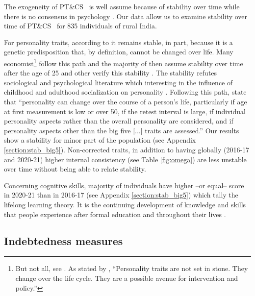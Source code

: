 \documentclass[a4paper, 11pt, onecolumn]{article}
\newcommand{\PTCS}{PT\&CS}
\begin{document}
The exogeneity of \PTCS~ is well assume because of stability over time while there is no consensus in psychology \citep{Ardelt2000, Deary2014}.
Our data allow us to examine stability over time of \PTCS~ for 835 individuals of rural India.

For personality traits, according to \cite{Costa1997, McCrae2000} it remains stable, in part, because it is a genetic predisposition that, by definition, cannot be changed over life.
Many economist\footnote{But not all, see \cite{Borghans2008, Almlund2011, Heckman2011}. As stated by \cite{Heckman2011}, ``Personality traits are not set in stone. They change over the life cycle. They are a possible avenue for intervention and policy.''} follow this path and the majority of then assume stability over time after the age of 25 and other verify this stability \citep{CobbClark2011}.
The stability refutes sociological and psychological literature which interesting in the influence of childhood and adulthood socialization on personality \citep{Mortimer1978, Moen1995}.
Following this path, \cite{Ardelt2000} state that ``personality can change over the course of a person's life, particularly if age at first measurement is low or over 50, if the retest interval is large, if individual personality aspects rather than the overall personality are considered, and if personality aspects other than the big five [...] traits are assessed.''
Our results show a stability for minor part of the population (see Appendix \ref{section:stab_big5}).
Non-corrected traits, in addition to having globally (2016-17 and 2020-21) higher internal consistency (see Table \ref{fig:omega}) are less unstable over time without being able to relate stability.

Concerning cognitive skills, majority of individuals have higher --or equal-- score in 2020-21 than in 2016-17 (see Appendix \ref{section:stab_big5}) which tally the lifelong learning theory.
It is the continuing development of knowledge and skills that people experience after formal education and throughout their lives \citep{London2011}.



	\subsection{Indebtedness measures}
\end{document}
